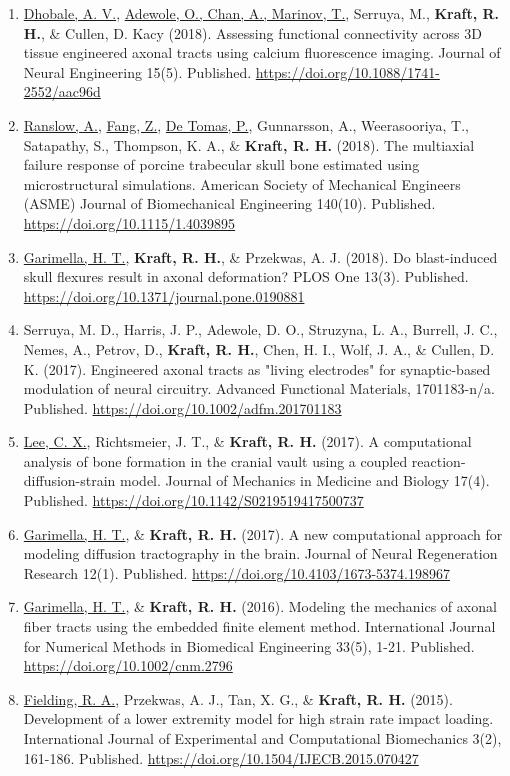 \documentclass[a4paper,10pt]{article}
\begin{document}
\begin{enumerate}
\item \underline{Dhobale, A. V.}, \underline{Adewole, O., Chan, A., Marinov, T.}, Serruya, M., \textbf{\textbf{Kraft,} R. H.}, \& Cullen, D. Kacy (2018). Assessing functional connectivity across 3D tissue engineered axonal tracts using calcium fluorescence imaging. Journal of Neural Engineering 15(5). Published. \url{https://doi.org/10.1088/1741-2552/aac96d}
\item \underline{Ranslow, A.}, \underline{Fang, Z.}, \underline{De Tomas, P.}, Gunnarsson, A., Weerasooriya, T., Satapathy, S., Thompson, K. A., \& \textbf{\textbf{Kraft,} R. H.} (2018). The multiaxial failure response of porcine trabecular skull bone estimated using microstructural simulations. American Society of Mechanical Engineers (ASME) Journal of Biomechanical Engineering 140(10). Published. \url{https://doi.org/10.1115/1.4039895}
\item \underline{Garimella, H. T.}, \textbf{\textbf{Kraft,} R. H.}, \& Przekwas, A. J. (2018). Do blast-induced skull flexures result in axonal deformation? PLOS One 13(3). Published. \url{https://doi.org/10.1371/journal.pone.0190881}
\item Serruya, M. D., Harris, J. P., Adewole, D. O., Struzyna, L. A., Burrell, J. C., Nemes, A., Petrov, D., \textbf{\textbf{Kraft,} R. H.}, Chen, H. I., Wolf, J. A., \& Cullen, D. K. (2017). Engineered axonal tracts as "living electrodes" for synaptic-based modulation of neural circuitry. Advanced Functional Materials, 1701183-n/a. Published. \url{https://doi.org/10.1002/adfm.201701183}
\item \underline{Lee, C. X.}, Richtsmeier, J. T., \& \textbf{\textbf{Kraft,} R. H.} (2017). A computational analysis of bone formation in the cranial vault using a coupled reaction-diffusion-strain model. Journal of Mechanics in Medicine and Biology 17(4). Published. \url{https://doi.org/10.1142/S0219519417500737}
\item \underline{Garimella, H. T.}, \& \textbf{\textbf{Kraft,} R. H.} (2017). A new computational approach for modeling diffusion tractography in the brain. Journal of Neural Regeneration Research 12(1). Published. \url{https://doi.org/10.4103/1673-5374.198967}
\item \underline{Garimella, H. T.}, \& \textbf{\textbf{Kraft,} R. H.} (2016). Modeling the mechanics of axonal fiber tracts using the embedded finite element method. International Journal for Numerical Methods in Biomedical Engineering 33(5), 1-21. Published. \url{https://doi.org/10.1002/cnm.2796}
\item \underline{Fielding, R. A.}, Przekwas, A. J., Tan, X. G., \& \textbf{\textbf{Kraft,} R. H.} (2015). Development of a lower extremity model for high strain rate impact loading. International Journal of Experimental and Computational Biomechanics 3(2), 161-186. Published. \url{https://doi.org/10.1504/IJECB.2015.070427}

\end{enumerate}
\end{document}
